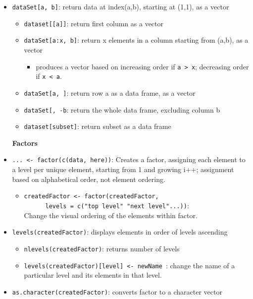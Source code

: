\documentclass{article}
\begin{document}
\begin{itemize}
\begin{center}
    \end{center}
    \item \verb|dataSet[a, b]|: return data at index(a,b), starting at (1,1), as a vector
    \begin{itemize}
        \item \verb|dataset[[a]]|: return first column as a vector
        \item \verb|dataSet[a:x, b]|: return x elements in a column starting from (a,b), as a vector
        \begin{itemize}
            \item produces a vector based on increasing order if \verb|a > x|; decreasing order if \verb|x < a|.
        \end{itemize}
        \item \verb|dataSet[a, ]|: return row a as a data frame, as a vector
        \item \verb|dataSet[, -b|: return the whole data frame, excluding column b
        \item \verb|dataset[subset]|: return subset as a data frame
    \end{itemize}
    \begin{center}
        \textbf{Factors}   
    \end{center}
    \item \verb|... <- factor(c(data, here))|: Creates a factor, assigning each element to a level per unique element, starting from 1 and growing i++; assignment based on alphabetical order, not element ordering.
        \begin{itemize}
            \item \verb|createdFactor <- factor(createdFactor, |\\
            \verb|      levels = c("top level" "next level"...))|: \\
            Change the visual ordering of the elements within factor.
        \end{itemize}
    \item \verb|levels(createdFactor)|: displays elements in order of levels ascending
    \begin{itemize}
        \item \verb|nlevels(createdFactor)|: returns number of levels
        \item \verb|levels(createdFactor)[level] <- newName |: change the name of a particular level and its elements in that level.
    \end{itemize}
    \item \verb|as.character(createdFactor)|: converts factor to a character vector

\end{itemize}
\end{document}
